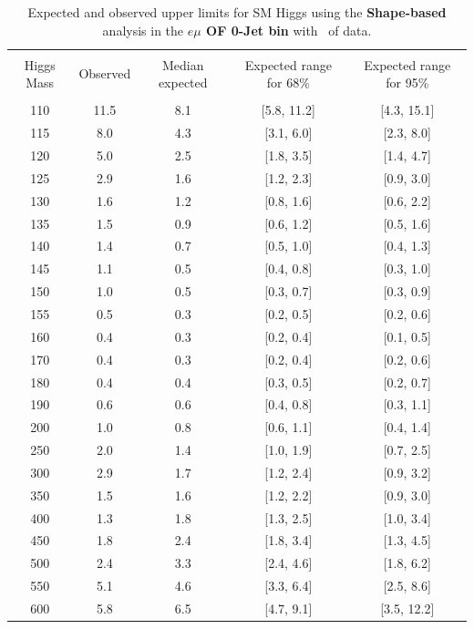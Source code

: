\begin{table}[hbp!]
\begin{center}
\begin{tabular}{c c c c c}
\hline
\vspace{-3mm} && \\
 Higgs Mass & Observed  & Median expected & Expected range for 68\% & Expected range for 95\%   \\
\vspace{-3mm} && \\
\hline
110 & 11.5 & 8.1 & [5.8, 11.2] & [4.3, 15.1] \\
115 & 8.0 & 4.3 & [3.1, 6.0] & [2.3, 8.0] \\
120 & 5.0 & 2.5 & [1.8, 3.5] & [1.4, 4.7] \\
125 & 2.9 & 1.6 & [1.2, 2.3] & [0.9, 3.0] \\
130 & 1.6 & 1.2 & [0.8, 1.6] & [0.6, 2.2] \\
135 & 1.5 & 0.9 & [0.6, 1.2] & [0.5, 1.6] \\
140 & 1.4 & 0.7 & [0.5, 1.0] & [0.4, 1.3] \\
145 & 1.1 & 0.5 & [0.4, 0.8] & [0.3, 1.0] \\
150 & 1.0 & 0.5 & [0.3, 0.7] & [0.3, 0.9] \\
155 & 0.5 & 0.3 & [0.2, 0.5] & [0.2, 0.6] \\
160 & 0.4 & 0.3 & [0.2, 0.4] & [0.1, 0.5] \\
170 & 0.4 & 0.3 & [0.2, 0.4] & [0.2, 0.6] \\
180 & 0.4 & 0.4 & [0.3, 0.5] & [0.2, 0.7] \\
190 & 0.6 & 0.6 & [0.4, 0.8] & [0.3, 1.1] \\
200 & 1.0 & 0.8 & [0.6, 1.1] & [0.4, 1.4] \\
250 & 2.0 & 1.4 & [1.0, 1.9] & [0.7, 2.5] \\
300 & 2.9 & 1.7 & [1.2, 2.4] & [0.9, 3.2] \\
350 & 1.5 & 1.6 & [1.2, 2.2] & [0.9, 3.0] \\
400 & 1.3 & 1.8 & [1.3, 2.5] & [1.0, 3.4] \\
450 & 1.8 & 2.4 & [1.8, 3.4] & [1.3, 4.5] \\
500 & 2.4 & 3.3 & [2.4, 4.6] & [1.8, 6.2] \\
550 & 5.1 & 4.6 & [3.3, 6.4] & [2.5, 8.6] \\
600 & 5.8 & 6.5 & [4.7, 9.1] & [3.5, 12.2] \\
\hline
\end{tabular}
\caption{Expected and observed upper limits for SM Higgs using the
  {\bf Shape-based} analysis in the {\bf $e\mu$ OF 0-Jet bin} with \intlumiEightTeV\ of data.}
\label{tab:bdtbase_uls_0jof}
\end{center}
\end{table}

